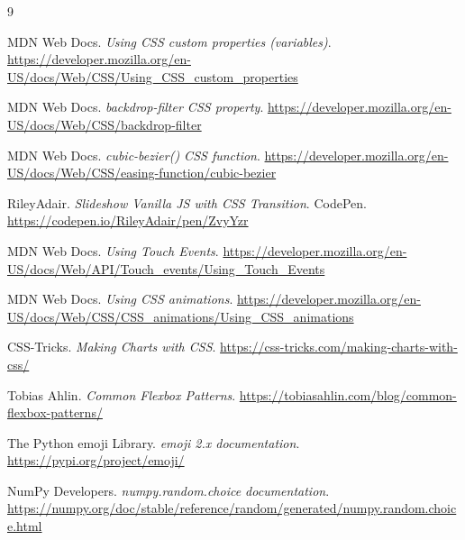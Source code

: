 \documentclass{article}
\begin{document}
\begin{thebibliography}{9}

MDN Web Docs.
\textit{Using CSS custom properties (variables)}.
\url{https://developer.mozilla.org/en-US/docs/Web/CSS/Using_CSS_custom_properties}

MDN Web Docs.
\textit{backdrop-filter CSS property}.
\url{https://developer.mozilla.org/en-US/docs/Web/CSS/backdrop-filter}

MDN Web Docs.
\textit{cubic-bezier() CSS function}.
\url{https://developer.mozilla.org/en-US/docs/Web/CSS/easing-function/cubic-bezier}

RileyAdair.
\textit{Slideshow Vanilla JS with CSS Transition}.
CodePen.
\url{https://codepen.io/RileyAdair/pen/ZvyYzr}

MDN Web Docs.
\textit{Using Touch Events}.
\url{https://developer.mozilla.org/en-US/docs/Web/API/Touch_events/Using_Touch_Events}

MDN Web Docs.
\textit{Using CSS animations}.
\url{https://developer.mozilla.org/en-US/docs/Web/CSS/CSS_animations/Using_CSS_animations}

CSS-Tricks.
\textit{Making Charts with CSS}.
\url{https://css-tricks.com/making-charts-with-css/}

Tobias Ahlin.
\textit{Common Flexbox Patterns}.
\url{https://tobiasahlin.com/blog/common-flexbox-patterns/}

The Python emoji Library.
\textit{emoji 2.x documentation}.
\url{https://pypi.org/project/emoji/}

NumPy Developers.
\textit{numpy.random.choice documentation}.
\url{https://numpy.org/doc/stable/reference/random/generated/numpy.random.choice.html}

\end{thebibliography}
\end{document}
